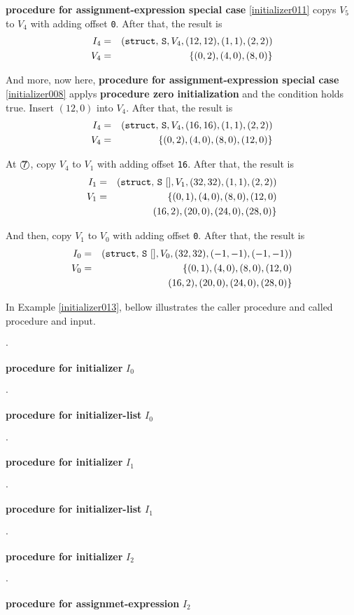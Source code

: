 \begin{Example}
{\bf procedure for assignment-expression special case} 
\ref{initializer011} copys $V_5$ to $V_4$ with adding offset {\tt{0}}.
After that, the result is
\begin{eqnarray*}
I_4 & = & ({\tt{struct,\,S}},V_4,(12,12),(1,1),(2,2)) \\
V_4 & = & \{(0,2), (4,0), (8,0) \}
\end{eqnarray*}

And more, now here,
{\bf procedure for assignment-expression special case} \ref{initializer008}
applys {\bf procedure zero initialization}
and the condition holds true. Insert $(12,0)$ into $V_4$.
After that, the result is
\begin{eqnarray*}
I_4 & = & ({\tt{struct,\,S}},V_4,(16,16),(1,1),(2,2)) \\
V_4 & = & \{(0,2), (4,0), (8,0), (12,0) \}
\end{eqnarray*}

\noindent
At $\MARU{\tt 7}$,
copy $V_4$ to $V_1$ with adding offset {\tt 16}.
After that, the result is
\begin{eqnarray*}
I_1 & = & ({\tt{struct,\,S\,\,[]}},V_1,(32,32),(1,1),(2,2)) \\
V_1 & = & \{(0,1), (4,0), (8,0), (12,0) \\
    &   &   (16,2), (20,0), (24,0), (28,0)  \}
\end{eqnarray*}

And then, copy $V_1$ to $V_0$ with adding offset {\tt{0}}.
After that, the result is
\begin{eqnarray*}
I_0 & = & ({\tt{struct,\,S\,\,[]}},V_0,(32,32),(-1,-1),(-1,-1)) \\
V_0 & = & \{(0,1), (4,0), (8,0), (12,0) \\
    &   &   (16,2), (20,0), (24,0), (28,0)  \}
\end{eqnarray*}

In Example \ref{initializer013}, bellow illustrates
the caller procedure and called procedure and input.

\begin{list}{$\cdot$}{}
\item {\bf procedure for initializer} $I_0$
    \begin{list}{$\cdot$}{}
    \item {\bf procedure for initializer-list} $I_0$
        \begin{list}{$\cdot$}{}
        \item {\bf procedure for initializer} $I_1$
            \begin{list}{$\cdot$}{}
            \item {\bf procedure for initializer-list} $I_1$
                \begin{list}{$\cdot$}{}
                \item {\bf procedure for initializer} $I_2$
                    \begin{list}{$\cdot$}{}
                    \item {\bf procedure for assignmet-expression} $I_2$


\end{list}
\end{list}
\end{list}
\end{list}
\end{list}
\end{list}
\end{Example}
